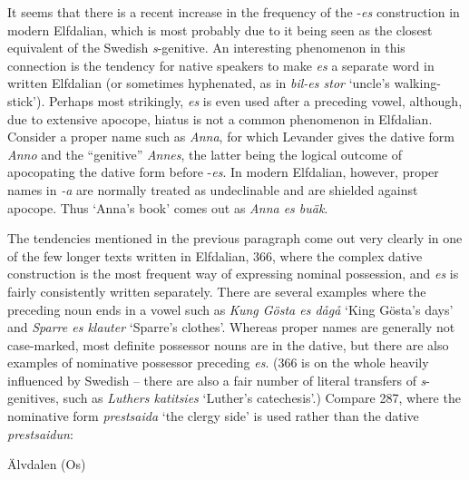 \begin{styleBodyTextFirst}
It seems that there is a recent increase in the frequency of the \nobreakdash-\textit{es} construction in modern Elfdalian, which is most probably due to it being seen as the closest equivalent of the Swedish \textit{s}{}-genitive. An interesting phenomenon in this connection is the tendency for native speakers to make \textit{es} a separate word in written Elfdalian (or sometimes hyphenated, as in \textit{bil-es stor} ‘uncle’s walking-stick’). Perhaps most strikingly, \textit{es} is even used after a preceding vowel, although, due to extensive apocope, hiatus is not a common phenomenon in Elfdalian. Consider a proper name such as \textit{Anna}, for which Levander gives the dative form \textit{Anno} and the “genitive” \textit{Annes}, the latter being the logical outcome of apocopating the dative form before -\textit{es}. In modern Elfdalian, however, proper names in\textit{ -a}\textit{ }are normally treated as undeclinable and are shielded against apocope. Thus ‘Anna’s book’ comes out as \textit{Anna es buäk}. 

\end{styleBodyTextFirst}

\begin{styleBodytextC}
The tendencies mentioned in the previous paragraph come out very clearly in one of the few longer texts written in Elfdalian, 366, where the complex dative construction is the most frequent way of expressing nominal possession, and \textit{es} is fairly consistently written separately. There are several examples where the preceding noun ends in a vowel such as \textit{Kung Gösta es dågå} ‘King Gösta’s days’ and \textit{Sparre es klauter} ‘Sparre’s clothes’. Whereas proper names are generally not case-marked, most definite possessor nouns are in the dative, but there are also examples of nominative possessor preceding \textit{es}. (366 is on the whole heavily influenced by Swedish – there are also a fair number of literal transfers of \textit{s}{}-genitives, such as\textit{ Luthers katitsies} ‘Luther’s catechesis’.) Compare 287, where the nominative form \textit{prestsaida} ‘the clergy side’ is used rather than the dative \textit{prestsaidun}:

\end{styleBodytextC}


\begin{listWWNumileveli}
\item 

\begin{styleExample}
\label{bkm:Ref135470135}Älvdalen (Os)

\end{styleExample}

\end{listWWNumileveli}

